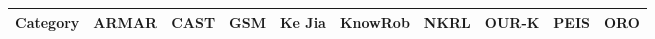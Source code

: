 \begin{landscape}
\begin{table}\tiny
\begin{center}
\begin{tabular}{p{0.2cm}p{3.4cm}p{1.6cm}p{1.3cm}p{1.7cm}p{1.5cm}p{2cm}p{2cm}p{1.4cm}p{1.4cm}|p{2cm}}
\toprule
\multicolumn{2}{c}{\bf Category}                                                     & ARMAR \cite{Holzapfel2008}& CAST \cite{Hawes2007}       & GSM \cite{Mavridis2006}     & {\sc Ke Jia} \cite{Chen2010}& {\sc KnowRob} \cite{Tenorth2009a}  & NKRL \cite{Sabri2011}                           & OUR-K \cite{Lim2011}          & PEIS \cite{Daoutis2009}       & ORO \cite{Lemaignan2010}                      \\
                                                                                                                                                                                                                                                                                                                                                                                                                  
\midrule                                                                                                                                                                                                                                                                                                                                                                                                          
                                                                                                                                                                                                                                                                                                                                                                                                                  

\end{tabular}
\end{center}
\end{table}
\end{landscape}
